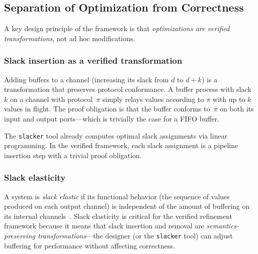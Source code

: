 \documentclass[11pt]{article}
\begin{document}
\subsection{Separation of Optimization from Correctness}
\label{sec:separation}

A key design principle of the framework is that \emph{optimizations
are verified transformations}, not ad hoc modifications.

\subsubsection{Slack insertion as a verified transformation}

Adding buffers to a channel (increasing its slack from $d$ to $d+k$)
is a transformation that preserves protocol conformance.  A buffer
process with slack~$k$ on a channel with protocol~$\pi$ simply relays
values according to $\pi$ with up to $k$ values in flight.  The proof
obligation is that the buffer conforms to~$\pi$ on both its input
and output ports---which is trivially the case for a FIFO buffer.

The \texttt{slacker} tool already computes optimal slack assignments
via linear programming.  In the verified framework, each slack
assignment is a pipeline insertion step with a trivial proof
obligation.

\subsubsection{Slack elasticity}
\label{sec:slack-elasticity}

A system is \emph{slack elastic} if its functional behavior (the
sequence of values produced on each output channel) is independent
of the amount of buffering on its internal
channels~\cite{manohar2001}.  Slack elasticity is critical for the
verified refinement framework because it means that slack insertion
and removal are \emph{semantics-preserving transformations}---the
designer (or the \texttt{slacker} tool) can adjust buffering for
performance without affecting correctness.
\end{document}
